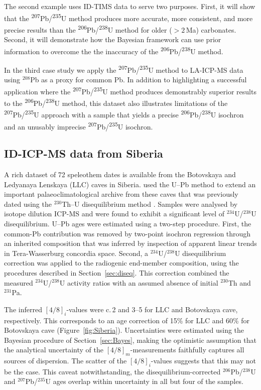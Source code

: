\documentclass{article}
\begin{document}
The second example uses ID-TIMS data to serve two purposes. First, it
will show that the \textsuperscript{207}Pb/\textsuperscript{235}U
method produces more accurate, more consistent, and more precise
results than the \textsuperscript{206}Pb/\textsuperscript{238}U method
for older ($>2$\,Ma) carbonates. Second, it will demonstrate how the
Bayesian framework can use prior information to overcome the the
inaccuracy of the \textsuperscript{206}Pb/\textsuperscript{238}U
method.\medskip

In the third case study we apply the
\textsuperscript{207}Pb/\textsuperscript{235}U method to LA-ICP-MS
data using ${}^{208}$Pb as a proxy for common Pb.  In addition to
highlighting a successful application where the
\textsuperscript{207}Pb/\textsuperscript{235}U method produces
demonstrably superior results to the
\textsuperscript{206}Pb/\textsuperscript{238}U method, this dataset
also illustrates limitations of the
\textsuperscript{207}Pb/\textsuperscript{235}U approach with a sample
that yields a precise \textsuperscript{206}Pb/\textsuperscript{238}U
isochron and an unusably imprecise
\textsuperscript{207}Pb/\textsuperscript{235}U isochron.

\subsection{ID-ICP-MS data from Siberia}
\label{sec:Vaks}

A rich dataset of 72 speleothem dates is available from the Botovskaya
and Ledyanaya Lenskaya (LLC) caves in Siberia. \citet{vaks2020} used
the U--Pb method to extend an important palaeoclimatological archive
from these caves that was previously dated using the ${}^{230}$Th--U
disequilibrium method \citep{vaks2013}.  Samples were analysed by
isotope dilution ICP-MS and were found to exhibit a significant level
of ${}^{234}$U/${}^{238}$U disequilibrium.  U--Pb ages were estimated
using a two-step procedure.  First, the common-Pb contribution was
removed by two-point isochron regression through an inherited
composition that was inferred by inspection of apparent linear trends
in Tera-Wasserburg concordia space. Second, a ${}^{234}$U/${}^{238}$U
disequilibrium correction was applied to the radiogenic end-member
composition, using the procedures described in
Section~\ref{sec:diseq}.  This correction combined the measured
${}^{234}$U/${}^{238}$U activity ratios with an assumed absence of
initial ${}^{230}$Th and ${}^{231}$Pa.\medskip

The inferred $[4/8]_i$-values were c.\,2 and 3--5 for LLC and
Botovskaya cave, respectively. This corresponds to an age correction
of 15\% for LLC and 60\% for Botovskaya cave
(Figure~\ref{fig:Siberia}). Uncertainties were estimated using the
Bayesian procedure of Section~\ref{sec:Bayes}, making the optimistic
assumption that the analytical uncertainty of the
$[4/8]_m$-measurements faithfully captures all sources of
dispersion. The scatter of the $[4/8]_i$-values suggests that this
may not be the case. This caveat notwithstanding, the
disequilibrium-corrected ${}^{206}$Pb/${}^{238}$U and
${}^{207}$Pb/${}^{235}$U ages overlap within uncertainty in all but
four of the samples.\medskip
\end{document}
